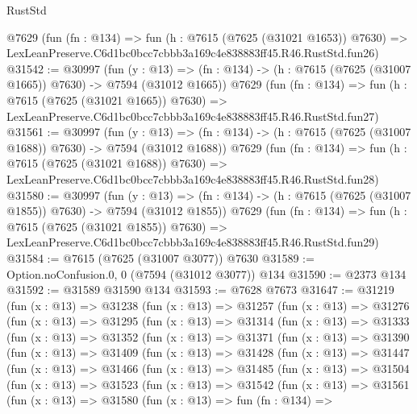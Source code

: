 \begin{lexlean}{RustStd}
\begin{coremodule}
    @7629
    (fun (fn : @134) =>
    fun (h : @7615 (@7625 (@31021 @1653)) @7630) =>
    LexLeanPreserve.C6d1bc0bcc7cbbb3a169c4e838883ff45.R46.RustStd.fun26)
@31542 := @30997
    (fun (y : @13) =>
    (fn : @134) -> (h : @7615 (@7625 (@31007 @1665)) @7630) -> @7594 (@31012 @1665))
    @7629
    (fun (fn : @134) =>
    fun (h : @7615 (@7625 (@31021 @1665)) @7630) =>
    LexLeanPreserve.C6d1bc0bcc7cbbb3a169c4e838883ff45.R46.RustStd.fun27)
@31561 := @30997
    (fun (y : @13) =>
    (fn : @134) -> (h : @7615 (@7625 (@31007 @1688)) @7630) -> @7594 (@31012 @1688))
    @7629
    (fun (fn : @134) =>
    fun (h : @7615 (@7625 (@31021 @1688)) @7630) =>
    LexLeanPreserve.C6d1bc0bcc7cbbb3a169c4e838883ff45.R46.RustStd.fun28)
@31580 := @30997
    (fun (y : @13) =>
    (fn : @134) -> (h : @7615 (@7625 (@31007 @1855)) @7630) -> @7594 (@31012 @1855))
    @7629
    (fun (fn : @134) =>
    fun (h : @7615 (@7625 (@31021 @1855)) @7630) =>
    LexLeanPreserve.C6d1bc0bcc7cbbb3a169c4e838883ff45.R46.RustStd.fun29)
@31584 := @7615 (@7625 (@31007 @3077)) @7630
@31589 := Option.noConfusion.{0, 0} (@7594 (@31012 @3077)) @134
@31590 := @2373 @134
@31592 := @31589 @31590 @134
@31593 := @7628 @7673
@31647 := @31219
    (fun (x : @13) =>
    @31238
      (fun (x : @13) =>
      @31257
        (fun (x : @13) =>
        @31276
          (fun (x : @13) =>
          @31295
            (fun (x : @13) =>
            @31314
              (fun (x : @13) =>
              @31333
                (fun (x : @13) =>
                @31352
                  (fun (x : @13) =>
                  @31371
                    (fun (x : @13) =>
                    @31390
                      (fun (x : @13) =>
                      @31409
                        (fun (x : @13) =>
                        @31428
                          (fun (x : @13) =>
                          @31447
                            (fun (x : @13) =>
                            @31466
                              (fun (x : @13) =>
                              @31485
                                (fun (x : @13) =>
                                @31504
                                  (fun (x : @13) =>
                                  @31523
                                    (fun (x : @13) =>
                                    @31542
                                      (fun (x : @13) =>
                                      @31561
                                        (fun (x : @13) =>
                                        @31580
                                          (fun (x : @13) =>
                                          fun (fn : @134) =>

\end{coremodule}
\end{lexlean}
